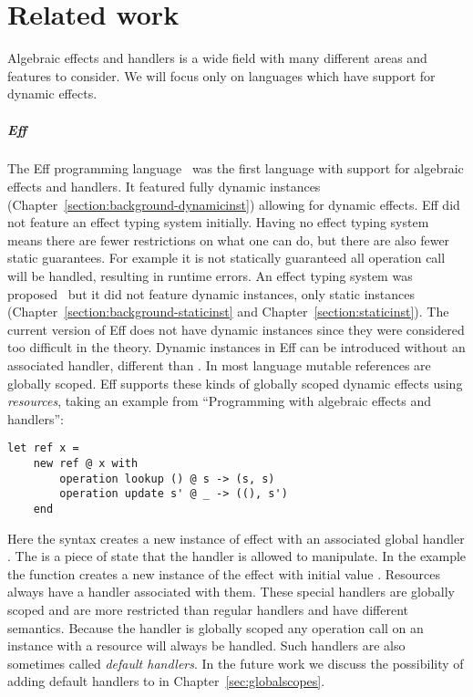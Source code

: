 \chapter{\label{chap:related}Related work}

Algebraic effects and handlers is a wide field with many different areas and features to consider.
We will focus only on languages which have support for dynamic effects.

\paragraph{Eff} \label{sec:eff}
The Eff programming language~\cite{eff1} was the first language with support for algebraic effects and handlers.
It featured fully dynamic instances (Chapter~\ref{section:background-dynamicinst}) allowing for dynamic effects.
Eff did not feature an effect typing system initially.
Having no effect typing system means there are fewer restrictions on what one can do, but there are also fewer static guarantees.
For example it is not statically guaranteed all operation call will be handled, resulting in runtime errors.
An effect typing system was proposed~\cite{eff2} but it did not feature dynamic instances, only static instances (Chapter~\ref{section:background-staticinst} and Chapter~\ref{section:staticinst}).
The current version of Eff does not have dynamic instances since they were considered too difficult in the theory.
Dynamic instances in Eff can be introduced without an associated handler, different than \lang{}.
In most language mutable references are globally scoped.
Eff supports these kinds of globally scoped dynamic effects using \emph{resources},
taking an example from ``Programming with algebraic effects and handlers''\cite{eff1}:
\newpage
\begin{verbatim}
let ref x =
	new ref @ x with
		operation lookup () @ s -> (s, s)
		operation update s' @ _ -> ((), s')
	end
\end{verbatim}
Here the  syntax creates a new instance of effect  with an associated global handler .
The  is a piece of state that the handler is allowed to manipulate.
In the example the  function creates a new instance of the  effect with initial value .
Resources always have a handler associated with them.
These special handlers are globally scoped and are more restricted than regular handlers and have different semantics.
Because the handler is globally scoped any operation call on an instance with a resource will always be handled.
Such handlers are also sometimes called \emph{default handlers}.
In the future work we discuss the possibility of adding default handlers to \lang{} in Chapter~\ref{sec:globalscopes}.
\\\\
